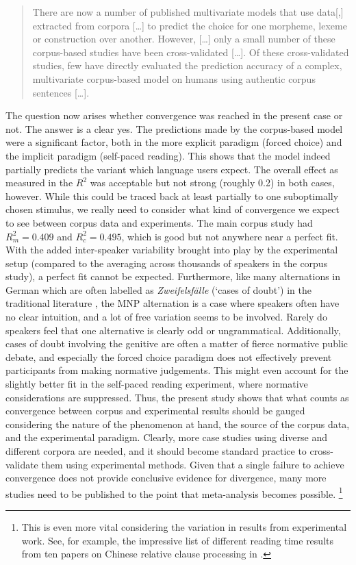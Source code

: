 \begin{quote}
  There are now a number of published multivariate models that use data[,] extracted from corpora [\ldots] to predict the choice for one morpheme, lexeme or construction over another.
  However, [\ldots] only a small number of these corpus-based studies have been cross-validated [\ldots].
  Of these cross-validated studies, few have directly evaluated the prediction accuracy of a complex, multivariate corpus-based model on humans using authentic corpus sentences [\ldots].
\end{quote}

The question now arises whether convergence was reached in the present case or not.
The answer is a clear yes.
The predictions made by the corpus-based model were a significant factor, both in the more explicit paradigm (forced choice) and the implicit paradigm (self-paced reading).
This shows that the model indeed partially predicts the variant which language users expect.
The overall effect as measured in the $R^2$ was acceptable but not strong (roughly 0.2) in both cases, however.
While this could be traced back at least partially to one suboptimally chosen stimulus, we really need to consider what kind of convergence we expect to see between corpus data and experiments.
The main corpus study had $R^2_m=0.409$ and $R^2_c=0.495$, which is good but not anywhere near a perfect fit.
With the added inter-speaker variability brought into play by the experimental setup (compared to the averaging across thousands of speakers in the corpus study), a perfect fit cannot be expected.
Furthermore, like many alternations in German which are often labelled as \textit{Zweifelsfälle} (`cases of doubt') in the traditional literature \citep{Duden09,Klein2009}, the MNP alternation is a case where speakers often have no clear intuition, and a lot of free variation seems to be involved.
Rarely do speakers feel that one alternative is clearly odd or ungrammatical.
Additionally, cases of doubt involving the genitive are often a matter of fierce normative public debate, and especially the forced choice paradigm does not effectively prevent participants from making normative judgements.
This might even account for the slightly better fit in the self-paced reading experiment, where normative considerations are suppressed.
Thus, the present study shows that what counts as convergence between corpus and experimental results should be gauged considering the nature of the phenomenon at hand, the source of the corpus data, and the experimental paradigm.
Clearly, more case studies using diverse and different corpora are needed, and it should become standard practice to cross-validate them using experimental methods.
Given that a single failure to achieve convergence does not provide conclusive evidence for divergence, many more studies need to be published to the point that meta-analysis becomes possible.%
\footnote{This is even more vital considering the variation in results from experimental work.
See, for example, the impressive list of different reading time results from ten papers on Chinese relative clause processing in \citet[8]{Vasishth2015}.}

